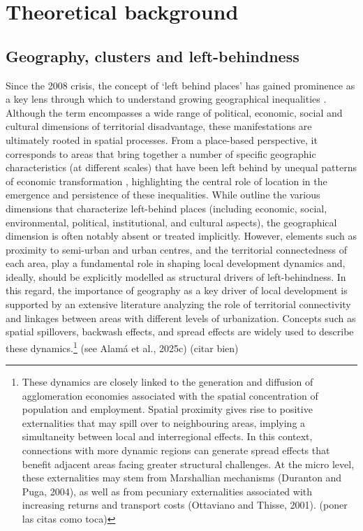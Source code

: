 \documentclass[a4paper,11pt,oneside]{article}
\begin{document}
\section{Theoretical background}
\label{sec:theoretical_background}





\subsection{Geography, clusters and left-behindness}
\label{sec:geography_clusters}


Since the 2008 crisis, the concept of ‘left behind places’ has gained prominence as a key lens through which to understand growing geographical inequalities \citep{pike2024left}. Although the term encompasses a wide range of political, economic, social and cultural dimensions of territorial disadvantage, these manifestations are ultimately rooted in spatial processes. From a place-based perspective, it corresponds to areas that bring together a number of specific geographic characteristics (at different scales) that have been left behind by unequal patterns of economic transformation \citep{martin2021levelling}, highlighting the central role of location in the emergence and persistence of these inequalities. While \cite{pike2024left} outline the various dimensions that characterize left-behind places (including economic, social, environmental, political, institutional, and cultural aspects), the geographical dimension is often notably absent or treated implicitly. However, elements such as proximity to semi-urban and urban centres, and the territorial connectedness of each area, play a fundamental role in shaping local development dynamics and, ideally, should be explicitly modelled as structural drivers of left-behindness. In this regard, the importance of geography as a key driver of local development is supported by an extensive literature analyzing the role of territorial connectivity and linkages between areas with different levels of urbanization. Concepts such as spatial spillovers, backwash effects, and spread effects are widely used to describe these dynamics.\footnote{These dynamics are closely linked to the generation and diffusion of agglomeration economies associated with the spatial concentration of population and employment. Spatial proximity gives rise to positive externalities that may spill over to neighbouring areas, implying a simultaneity between local and interregional effects. In this context, connections with more dynamic regions can generate spread effects that benefit adjacent areas facing greater structural challenges. At the micro level, these externalities may stem from Marshallian mechanisms (Duranton and Puga, 2004), as well as from pecuniary externalities associated with increasing returns and transport costs (Ottaviano and Thisse, 2001). \color{red} (poner las citas como toca)} {\color{red} (see Alamá et al., 2025c) (citar bien) }
\end{document}
